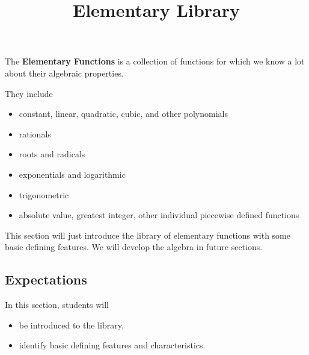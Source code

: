 \documentclass{ximera}
\title{Elementary Library}
\begin{document}
\begin{abstract}
\end{abstract}
\maketitle




The \textbf{Elementary Functions} is a collection of functions for which we know a lot about their algebraic properties.

They include 

\begin{itemize}
\item constant, linear, quadratic, cubic, and other polynomials
\item rationals
\item roots and radicals
\item exponentials and logarithmic
\item trigonometric
\item absolute value, greatest integer, other individual piecewise defined functions
\end{itemize}



This section will just introduce the library of elementary functions with some basic defining features.  We will develop the algebra in future sections.












\subsection{Expectations}

\begin{sectionOutcomes}
In this section, students will 

\begin{itemize}
\item be introduced to the library.
\item identify basic defining features and characteristics.
\end{itemize}
\end{sectionOutcomes}
\end{document}
